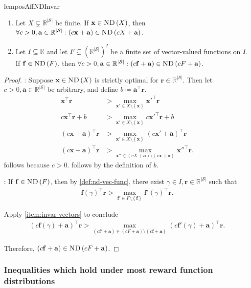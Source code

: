 \documentclass{article}
\renewcommand{\abs}[1]{\left|#1\right|}
\newcommand*{\prn}[1]{\left(#1\right)}
\renewcommand{\set}[1]{\left\{#1\right\}}
\newcommand*{\defeq}{\coloneqq} %
\newcommand*{\x}{\mathbf{x}} %
\newcommand*{\av}{\mathbf{a}}
\newcommand*{\reals}{\mathbb{R}}
\newcommand*{\upsc}[1]{\text{\upshape\textsc{#1}}}
\newcommand*{\St}{\mathcal{S}}
\newcommand*{\rf}{\mathbf{r}} %
\newcommand*{\rewardVS}{\reals^{\abs{\St}}} %
\newcommand*{\f}{\mathbf{f}} %
\newcommand*{\ND}[1]{\upsc{ND}\prn{#1}}
\theoremstyle{definition}
\begin{document}
\begin{appendices}
\begin{restatable}{lem}{posAffNDInvar}\label{lem:pos-aff-nd-invar}\hfill
\begin{enumerate}
    \item Let $X\subsetneq \rewardVS$ be finite. If $\x\in \ND{X}$, then $\forall c>0, \av\in\rewardVS: (c\x+\av) \in \ND{cX+\av}$.\label{item:invar-vectors}
    \item Let $I\subseteq \reals$ and let $F\subsetneq \prn{\rewardVS}^I$ be a finite set of vector-valued functions on $I$. If $\f \in \ND{F}$, then $\forall c>0, \av\in\rewardVS: (c\f+\av) \in \ND{cF+\av}$.\label{item:invar-vector-fns}
\end{enumerate}
\end{restatable}
\begin{proof}
: Suppose $\x\in \ND{X}$ is strictly optimal for $\rf\in\rewardVS$. Then let $c>0,\av\in\rewardVS$ be arbitrary, and define $b\defeq \av^\top \rf$. 
\begin{align}
    \x^\top\rf &> \max_{\x'\in X\setminus\set{\x}} \x'^\top \rf\\
    c\x^\top\rf+b &> \max_{\x'\in X\setminus\set{\x}} c\x'^\top \rf+b\label{eq:rescale-c}\\
    (c\x+\av)^\top\rf &> \max_{\x'\in X\setminus\set{\x}} (c\x'+\av)^\top \rf\label{eq:b-defn}\\
    (c\x+\av)^\top\rf &> \max_{\x''\in \prn{cX+\av}\setminus\set{c\x+\av}} \x''^\top \rf.
\end{align}
 follows because $c>0$.  follows by the definition of $b$.

: If $\f\in\ND{F}$, then by \cref{def:nd-vec-func}, there exist $\gamma\in I, \rf\in\rewardVS$ such that
\begin{align}
    \f(\gamma)^\top \rf> \max_{\f'\in F\setminus \set{\f}}\f'(\gamma)^\top \rf.
\end{align}

Apply \cref{item:invar-vectors} to conclude
\begin{align}
    (c\f(\gamma)+\av)^\top \rf> \max_{(c\f'+\av)\in (cF+\av)\setminus \set{c\f+\av}}(c\f'(\gamma)+\av)^\top \rf.
\end{align}

Therefore, $(c\f+\av) \in \ND{cF+\av}$.
\end{proof}

\subsubsection{Inequalities which hold under most reward function distributions}


\end{appendices}
\end{document}
